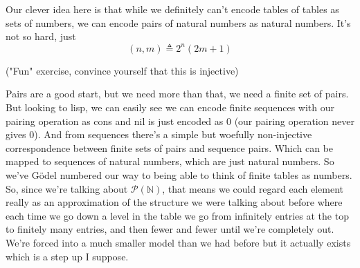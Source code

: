 \documentclass{amsart}
\begin{document}
Our clever idea here is that while we definitely can't encode tables
of tables as sets of numbers, we can encode pairs of natural numbers
as natural numbers. It's not so hard, just
\[
  (n, m) \triangleq 2^n(2m + 1)
\]

("Fun" exercise, convince yourself that this is injective)

Pairs are a good start, but we need more than that, we need a finite
set of pairs. But looking to lisp, we can easily see we can encode
finite sequences with our pairing operation as cons and nil is just
encoded as 0 (our pairing operation never gives 0). And from sequences
there's a simple but woefully non-injective correspondence between
finite sets of pairs and sequence pairs. Which can be mapped to
sequences of natural numbers, which are just natural numbers. So we've
G\"odel numbered our way to being able to think of finite tables as
numbers. So, since we're talking about $\mathcal{P}(\mathbb{N})$,
that means we could regard each element really as an approximation of
the structure we were talking about before where each time we go down
a level in the table we go from infinitely entries at the top to
finitely many entries, and then fewer and fewer until we're completely
out. We're forced into a much smaller model than we had before but it
actually exists which is a step up I suppose.
\end{document}
